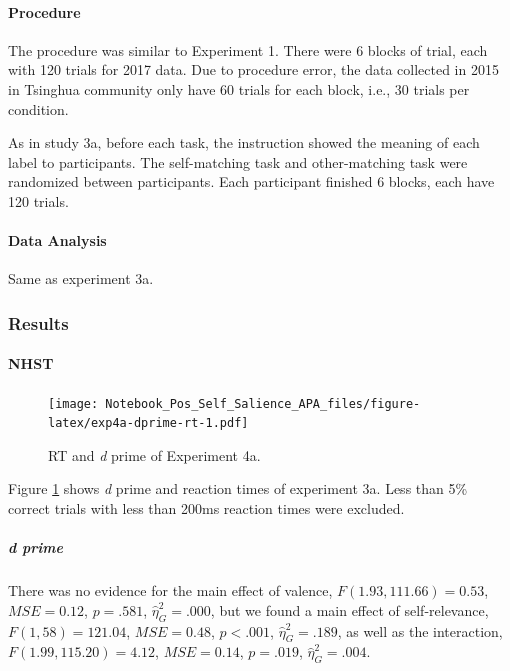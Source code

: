 \documentclass[
  english,
  man]{apa6}
\let\oldparagraph\paragraph
\renewcommand{\paragraph}[1]{\oldparagraph{#1}\mbox{}}
\let\oldsubparagraph\subparagraph
\renewcommand{\subparagraph}[1]{\oldsubparagraph{#1}\mbox{}}
\begin{document}
\hypertarget{procedure-8}{%
\paragraph{Procedure}\label{procedure-8}}

The procedure was similar to Experiment 1. There were 6 blocks of trial, each with 120 trials for 2017 data. Due to procedure error, the data collected in 2015 in Tsinghua community only have 60 trials for each block, i.e., 30 trials per condition.

As in study 3a, before each task, the instruction showed the meaning of each label to participants. The self-matching task and other-matching task were randomized between participants. Each participant finished 6 blocks, each have 120 trials.

\hypertarget{data-analysis-9}{%
\paragraph{Data Analysis}\label{data-analysis-9}}

Same as experiment 3a.

\hypertarget{results-7}{%
\subsubsection{Results}\label{results-7}}

\hypertarget{nhst-6}{%
\paragraph{NHST}\label{nhst-6}}

\begin{figure}
\centering
\texttt{[image: Notebook\_Pos\_Self\_Salience\_APA\_files/figure-latex/exp4a-dprime-rt-1.pdf]}
\caption{\label{fig:exp4a-dprime-rt}RT and \emph{d} prime of Experiment 4a.}
\end{figure}

Figure \ref{fig:exp4a-dprime-rt} shows \emph{d} prime and reaction times of experiment 3a. Less than 5\% correct trials with less than 200ms reaction times were excluded.

\hypertarget{d-prime-6}{%
\subparagraph{d prime}\label{d-prime-6}}

There was no evidence for the main effect of valence, \(F(1.93, 111.66) = 0.53\), \(\mathit{MSE} = 0.12\), \(p = .581\), \(\hat{\eta}^2_G = .000\), but we found a main effect of self-relevance, \(F(1, 58) = 121.04\), \(\mathit{MSE} = 0.48\), \(p < .001\), \(\hat{\eta}^2_G = .189\), as well as the interaction, \(F(1.99, 115.20) = 4.12\), \(\mathit{MSE} = 0.14\), \(p = .019\), \(\hat{\eta}^2_G = .004\).
\end{document}
